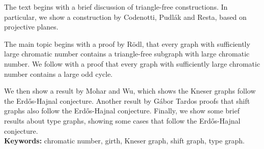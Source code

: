 \documentclass[11pt,twoside,a4paper]{book}
\begin{document}
The text begins with a brief discussion of triangle-free constructions. In particular, we show a construction by Codenotti, Pudlák and Resta, based on projective planes.

The main topic begins with a proof by R\"{o}dl, that every graph with sufficiently large chromatic number contains a triangle-free subgraph with large chromatic number. We follow with a proof that every graph with sufficiently large chromatic number contains a large odd cycle.

We then show a result by Mohar and Wu, which shows the Kneser graphs follow the Erd\H{o}s-Hajnal conjecture. Another result by Gábor Tardos proofs that shift graphs also follow the Erd\H{o}s-Hajnal conjecture. Finally, we show some brief results about type graphs, showing some cases that follow the Erd\H{o}s-Hajnal conjecture.
\\

\noindent \textbf{Keywords:} chromatic number, girth, Kneser graph, shift graph, type graph.

\tableofcontents    %

\end{document}
